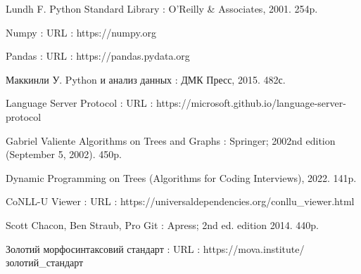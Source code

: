 \begin{thebibliography}{99}
Lundh F. Python Standard Library : O’Reilly \& Associates, 2001. 254p.

Numpy : URL : https://numpy.org

Pandas : URL : https://pandas.pydata.org

Маккинли У. Python и анализ данных : ДМК Пресс, 2015. 482с.

Language Server Protocol : URL :
https://microsoft.github.io/language-server-protocol

Gabriel Valiente Algorithms on Trees and Graphs : Springer; 2002nd edition
(September 5, 2002). 450p.

Dynamic Programming on Trees (Algorithms for Coding Interviews), 2022. 141p.

CoNLL-U Viewer : URL : https://universaldependencies.org/conllu\_viewer.html

Scott Chacon, Ben Straub, Pro Git : Apress; 2nd ed. edition 2014. 440p.

Золотий морфосинтаксовий стандарт : URL :
https://mova.institute/золотий\_стандарт

\end{thebibliography}